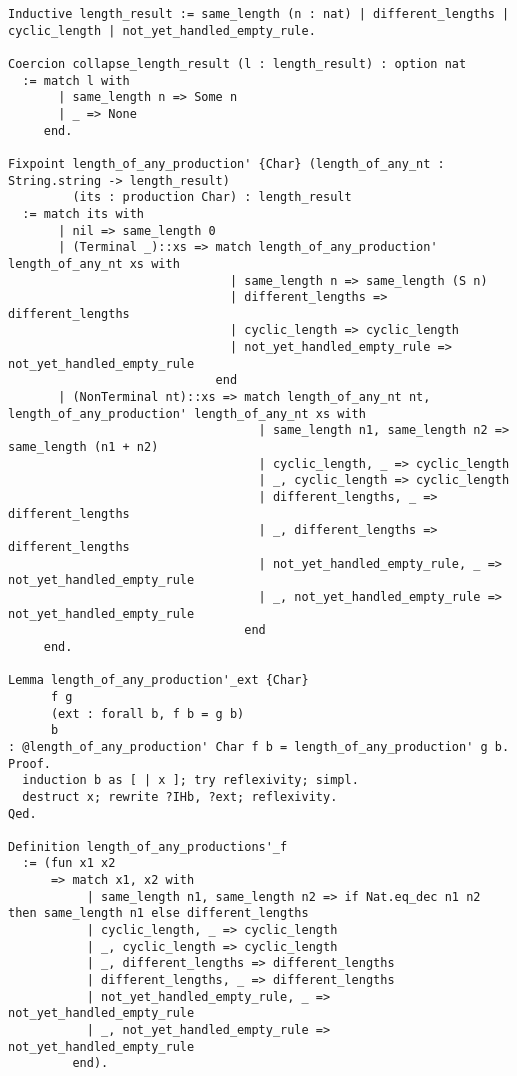 \begin{verbatim}
Inductive length_result := same_length (n : nat) | different_lengths | cyclic_length | not_yet_handled_empty_rule.

Coercion collapse_length_result (l : length_result) : option nat
  := match l with
       | same_length n => Some n
       | _ => None
     end.

Fixpoint length_of_any_production' {Char} (length_of_any_nt : String.string -> length_result)
         (its : production Char) : length_result
  := match its with
       | nil => same_length 0
       | (Terminal _)::xs => match length_of_any_production' length_of_any_nt xs with
                               | same_length n => same_length (S n)
                               | different_lengths => different_lengths
                               | cyclic_length => cyclic_length
                               | not_yet_handled_empty_rule => not_yet_handled_empty_rule
                             end
       | (NonTerminal nt)::xs => match length_of_any_nt nt, length_of_any_production' length_of_any_nt xs with
                                   | same_length n1, same_length n2 => same_length (n1 + n2)
                                   | cyclic_length, _ => cyclic_length
                                   | _, cyclic_length => cyclic_length
                                   | different_lengths, _ => different_lengths
                                   | _, different_lengths => different_lengths
                                   | not_yet_handled_empty_rule, _ => not_yet_handled_empty_rule
                                   | _, not_yet_handled_empty_rule => not_yet_handled_empty_rule
                                 end
     end.

Lemma length_of_any_production'_ext {Char}
      f g
      (ext : forall b, f b = g b)
      b
: @length_of_any_production' Char f b = length_of_any_production' g b.
Proof.
  induction b as [ | x ]; try reflexivity; simpl.
  destruct x; rewrite ?IHb, ?ext; reflexivity.
Qed.

Definition length_of_any_productions'_f
  := (fun x1 x2
      => match x1, x2 with
           | same_length n1, same_length n2 => if Nat.eq_dec n1 n2 then same_length n1 else different_lengths
           | cyclic_length, _ => cyclic_length
           | _, cyclic_length => cyclic_length
           | _, different_lengths => different_lengths
           | different_lengths, _ => different_lengths
           | not_yet_handled_empty_rule, _ => not_yet_handled_empty_rule
           | _, not_yet_handled_empty_rule => not_yet_handled_empty_rule
         end).


\end{verbatim}
